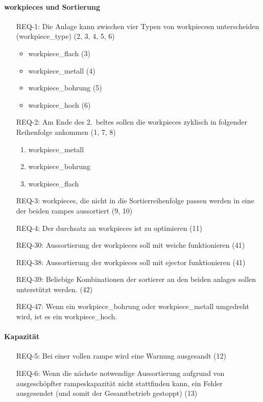 \paragraph{\glspl{workpiece} und Sortierung}
\begin{itemize}
    \item[REQ-1:] Die Anlage kann zwischen vier Typen von \glspl{workpiece}n unterscheiden (\gls{workpiece_type}) (2, 3, 4, 5, 6)
    \begin{itemize}
        \item \gls{workpiece_flach} (3)
        \item \gls{workpiece_metall} (4)
        \item \gls{workpiece_bohrung} (5)
        \item \gls{workpiece_hoch} (6)
    \end{itemize}
    \item[REQ-2:] Am Ende des 2.\ \gls{belt}es sollen die \glspl{workpiece} zyklisch in folgender Reihenfolge ankommen (1, 7, 8)
    \begin{enumerate}
        \item \gls{workpiece_metall}
        \item \gls{workpiece_bohrung}
        \item \gls{workpiece_flach}
    \end{enumerate}
    \item[REQ-3:] \glspl{workpiece}, die nicht in die Sortierreihenfolge passen werden in eine der beiden \glspl{rampe} aussortiert (9, 10)
    \item[REQ-4:] Der \gls{durchsatz} an \glspl{workpiece} ist zu optimieren (11)
    \item[REQ-30:] Aussortierung der \glspl{workpiece} soll mit \gls{weiche} funktionieren (41)
    \item[REQ-38:] Aussortierung der \glspl{workpiece} soll mit \gls{ejector} funktionieren (41)
    \item[REQ-39:] Beliebige Kombinationen der \gls{sortierer} an den beiden \glspl{anlage} sollen unterstützt werden. (42)
    \item[REQ-47:] Wenn ein \gls{workpiece_bohrung} oder \gls{workpiece_metall} umgedreht wird, ist es ein \gls{workpiece_hoch}.
\end{itemize}

\paragraph{Kapazität}
\begin{itemize}
    \item[REQ-5:] Bei einer vollen \gls{rampe} wird eine Warnung ausgesandt (12)
    \item[REQ-6:] Wenn die nächste notwendige Aussortierung aufgrund von ausgeschöpfter \glspl{rampe}kapazität
    nicht stattfinden kann, ein Fehler ausgesendet (und somit der Gesamtbetrieb gestoppt) (13)
\end{itemize}

